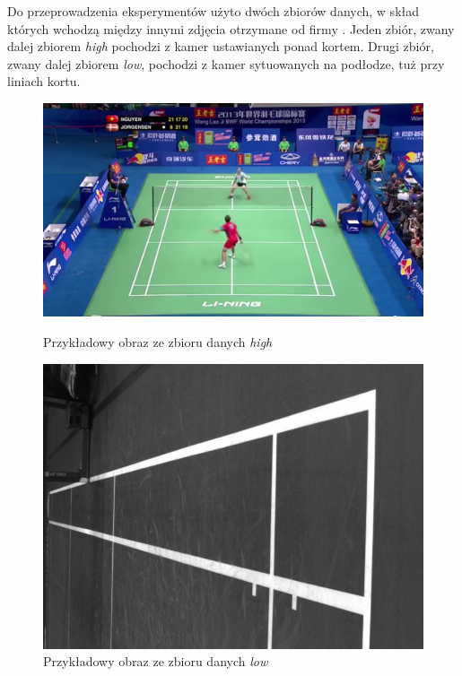 
Do przeprowadzenia eksperymentów użyto dwóch zbiorów danych, w skład których wchodzą między innymi zdjęcia otrzymane od firmy \blue{}.
Jeden zbiór, zwany dalej zbiorem \textit{high} pochodzi z kamer ustawianych ponad kortem.
Drugi zbiór, zwany dalej zbiorem \textit{low}, pochodzi z kamer sytuowanych na podłodze, tuż przy liniach kortu.


\begin{figure}[!htb]
    \includegraphics[width=\linewidth]{../../badminton/datasets/high/split/test_court2-00002.png}
    \caption{Przykładowy obraz ze zbioru danych \textit{high}}
  \endminipage\hfill
    \includegraphics[width=\linewidth]{../../badminton/datasets/low/split/1564909032792410075.jpg}
    \caption{Przykładowy obraz ze zbioru danych \textit{low}}
  \endminipage\hfill
\end{figure}

